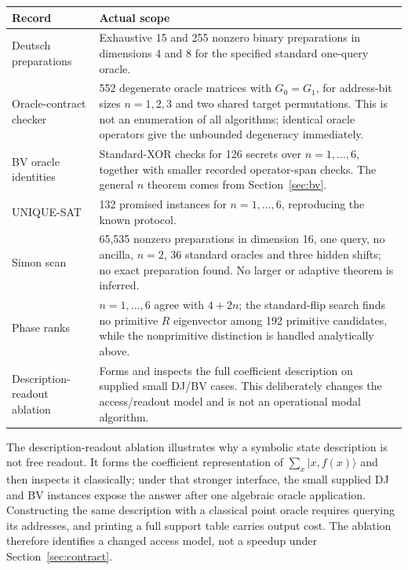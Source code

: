 \documentclass[11pt]{article}
\begin{document}
\begin{center}\small
\begin{tabular}{@{}L{.28\linewidth}L{.62\linewidth}@{}}
\toprule
Record & Actual scope\\\midrule
Deutsch preparations & Exhaustive 15 and 255 nonzero binary preparations in dimensions 4 and 8 for the specified standard one-query oracle.\\
Oracle-contract checker & 552 degenerate oracle matrices with $G_0=G_1$, for address-bit sizes $n=1,2,3$ and two shared target permutations. This is not an enumeration of all algorithms; identical oracle operators give the unbounded degeneracy immediately.\\
BV oracle identities & Standard-XOR checks for 126 secrets over $n=1,\ldots,6$, together with smaller recorded operator-span checks. The general $n$ theorem comes from Section~\ref{sec:bv}.\\
UNIQUE-SAT & 132 promised instances for $n=1,\ldots,6$, reproducing the known protocol.\\
Simon scan & 65,535 nonzero preparations in dimension 16, one query, no ancilla, $n=2$, 36 standard oracles and three hidden shifts; no exact preparation found. No larger or adaptive theorem is inferred.\\
Phase ranks & $n=1,\ldots,6$ agree with $4+2n$; the standard-flip search finds no primitive $R$ eigenvector among 192 primitive candidates, while the nonprimitive distinction is handled analytically above.\\
Description-readout ablation & Forms and inspects the full coefficient description on supplied small DJ/BV cases. This deliberately changes the access/readout model and is not an operational modal algorithm.\\\bottomrule
\end{tabular}
\end{center}

The description-readout ablation illustrates why a symbolic state description is not free readout. It forms the coefficient representation of $\sum_x|x,f(x)\rangle$ and then inspects it classically; under that stronger interface, the small supplied DJ and BV instances expose the answer after one algebraic oracle application. Constructing the same description with a classical point oracle requires querying its addresses, and printing a full support table carries output cost. The ablation therefore identifies a changed access model, not a speedup under Section~\ref{sec:contract}.
\end{document}

